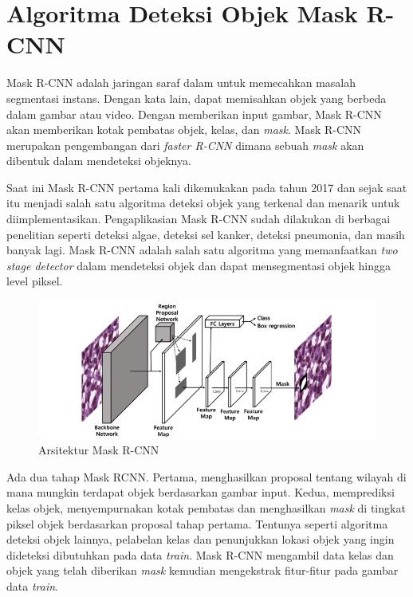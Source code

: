 \section{Algoritma Deteksi Objek Mask R-CNN}

Mask R-CNN \cite{https://doi.org/10.48550/arxiv.1703.06870} adalah jaringan saraf dalam untuk memecahkan masalah segmentasi instans. 
Dengan kata lain, dapat memisahkan objek yang berbeda dalam gambar atau video. 
Dengan memberikan input gambar, Mask R-CNN akan memberikan kotak pembatas objek, kelas, dan \textit{mask}.
Mask R-CNN merupakan pengembangan dari \textit{faster R-CNN} dimana sebuah \textit{mask} akan dibentuk
dalam mendeteksi objeknya.

Saat ini Mask R-CNN pertama kali dikemukakan pada tahun 2017 dan sejak saat itu menjadi salah satu algoritma
deteksi objek yang terkenal dan menarik untuk diimplementasikan. Pengaplikasian Mask R-CNN sudah dilakukan
di berbagai penelitian seperti deteksi algae, deteksi sel kanker, deteksi pneumonia, dan masih banyak lagi.
Mask R-CNN adalah salah satu algoritma yang memanfaatkan \textit{two stage detector} dalam mendeteksi objek
dan dapat mensegmentasi objek hingga level piksel.

\begin{figure}[h!]
    \begin{center}
      \includegraphics[width= 1\linewidth]{bab2/Mask R-CNN Archi.png}
      \caption{Arsitektur Mask R-CNN \cite{Mask-archi}}
      \label{fig: Mask RCNN Archi}
    \end{center}
\end{figure}

Ada dua tahap Mask RCNN. Pertama, menghasilkan proposal tentang wilayah di mana mungkin terdapat objek 
berdasarkan gambar input. Kedua, memprediksi kelas objek, menyempurnakan kotak pembatas dan 
menghasilkan \textit{mask} di tingkat piksel objek berdasarkan proposal tahap pertama.
Tentunya seperti algoritma deteksi objek lainnya, pelabelan kelas dan penunjukkan lokasi objek
yang ingin dideteksi dibutuhkan pada data \textit{train}. Mask R-CNN mengambil data kelas dan objek
yang telah diberikan \textit{mask} kemudian mengekstrak fitur-fitur pada gambar data \textit{train}.

